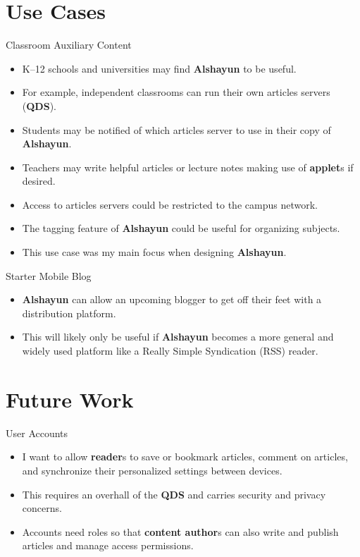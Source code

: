 \documentclass{beamer}
\begin{document}
\section{Use Cases}

\begin{frame}{Classroom Auxiliary Content}
    \begin{itemize}
        \item K--12 schools and universities may find \textbf{Alshayun} to be
            useful.
        \item For example, independent classrooms can run their own articles
            servers (\textbf{QDS}).
        \item Students may be notified of which articles server to use in their
            copy of \textbf{Alshayun}.
        \item Teachers may write helpful articles or lecture notes making use of
            \textbf{applet}s if desired.
        \item Access to articles servers could be restricted to the campus
            network.
        \item The tagging feature of \textbf{Alshayun} could be useful for
            organizing subjects.
        \item This use case was my main focus when designing \textbf{Alshayun}.
    \end{itemize}
\end{frame}

\begin{frame}{Starter Mobile Blog}
    \begin{itemize}
        \item \textbf{Alshayun} can allow an upcoming blogger to get off their
            feet with a distribution platform.
        \item This will likely only be useful if \textbf{Alshayun} becomes a
            more general and widely used platform like a Really Simple
            Syndication (RSS) reader.
    \end{itemize}
\end{frame}

\section{Future Work}

\begin{frame}{User Accounts}
    \begin{itemize}
        \item I want to allow \textbf{reader}s to save or bookmark articles,
            comment on articles, and synchronize their personalized settings
            between devices.
        \item This requires an overhall of the \textbf{QDS} and carries security
            and privacy concerns.
        \item Accounts need roles so that \textbf{content author}s can also
            write and publish articles and manage access permissions.
    \end{itemize}
\end{frame}
\end{document}

